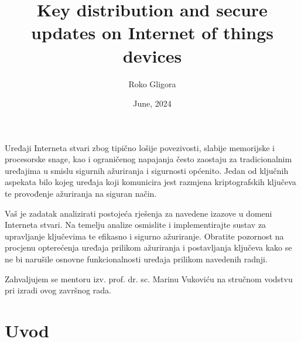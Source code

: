 \documentclass[zavrsnirad]{fer}
\title{Key distribution and secure updates on Internet of things devices}
\author{Roko Gligora}
\date{June, 2024}
\begin{document}
	\lstset{style=mystyle}
	
	\maketitle
	
	Uređaji Interneta stvari zbog tipično lošije povezivosti, slabije memorijske i procesorske snage, kao i ograničenog napajanja često zaostaju za tradicionalnim uređajima u smislu sigurnih ažuriranja i sigurnosti općenito. Jedan od ključnih aspekata bilo kojeg uređaja koji komunicira jest razmjena kriptografskih ključeva te provođenje ažuriranja na siguran način.
	
	Vaš je zadatak analizirati postojeća rješenja za navedene izazove u domeni Interneta stvari. Na temelju analize osmislite i implementirajte sustav za upravljanje ključevima te efikasno i sigurno ažuriranje. Obratite pozornost na procjenu opterećenja uređaja prilikom ažuriranja i postavljanja ključeva kako se ne bi narušile osnovne funkcionalnosti uređaja prilikom navedenih radnji.
	
	\begin{zahvale}
		Zahvaljujem se mentoru izv. prof. dr. sc. Marinu Vukoviću na stručnom vodstvu pri izradi ovog završnog rada.
	\end{zahvale}
	
	\mainmatter
	
	\tableofcontents
	
	\chapter{Uvod}
	\label{pog:uvod}
	
\end{document}
